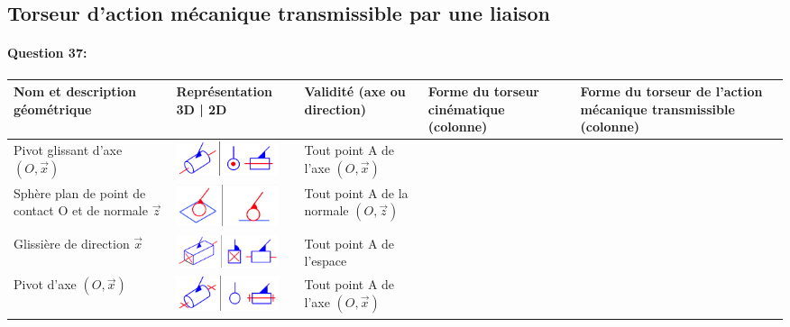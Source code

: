 \reponse[5]

\cleardoublepage

\subsection{Torseur d'action mécanique transmissible par une liaison}

\paragraph{Question 37:}

\begin{center}
\begin{tabular}{|P{3cm}|P{3cm}|P{2cm}|P{2.5cm}|P{2.5cm}|}
\hline
Nom et description géométrique& Représentation 3D | 2D & Validité (axe ou direction) & Forme du torseur cinématique  (colonne) & Forme du torseur de l'action mécanique transmissible (colonne) \\
\hline
Pivot glissant d'axe $(O,\overrightarrow{x})$ & \vspace{0.5pt} \includegraphics[width=3cm]{img/rep6} & Tout point A de l'axe $(O,\overrightarrow{x})$ & & \\
\hline
Sphère plan de point de contact O et de normale $\overrightarrow{z}$ & \vspace{0.5pt} \includegraphics[width=3cm]{img/rep7} & Tout point A de la normale $(O,\overrightarrow{z})$ & & \\
\hline
Glissière de direction $\overrightarrow{x}$ & \vspace{0.5pt} \includegraphics[width=3cm]{img/rep8} & Tout point A de l'espace & & \\
\hline
Pivot d'axe $(O,\overrightarrow{x})$ & \vspace{0.5pt} \includegraphics[width=3cm]{img/rep9} & Tout point A de l'axe $(O,\overrightarrow{x})$ & & \\

\end{tabular}
\end{center}
